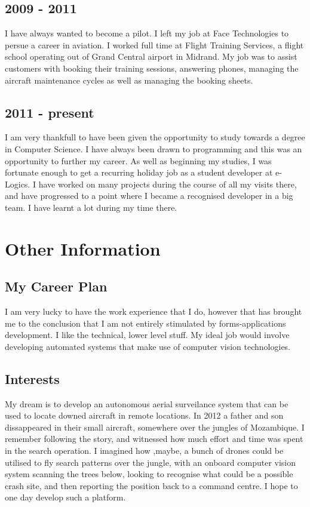 	\subsection*{2009 - 2011}
		I have always wanted to become a pilot. I left my job at Face Technologies to persue a career in aviation. I worked full time at
		Flight Training Services, a flight school operating out of Grand Central airport in Midrand. My job was to assist customers with
		booking their training sessions, answering phones, managing the aircraft maintenance cycles as well as managing the booking sheets.
	\subsection*{2011 - present}
		I am very thankfull to have been given the opportunity to study towards a degree in Computer Science. I have always been drawn to programming
		and this was an opportunity to further my career. As well as beginning my studies, I was fortunate enough to get a recurring holiday job as
		a student developer at e-Logics. I have worked on many projects during the course of all my visits there, and have progressed to a point where I
		became a recognised developer in a big team. I have learnt a lot during my time there.
\newpage
\section*{Other Information}

	\subsection*{My Career Plan}
	
	I am very lucky to have the work experience that I do, however that has brought me to the conclusion that I am not entirely stimulated by forms-applications development.
	I like the technical, lower level stuff. My ideal job would involve developing automated systems that make use of computer vision technologies. 

	\subsection*{Interests}
	
	My dream is to develop an autonomous aerial surveilance system that can be used to locate downed aircraft in remote locations. In 2012 a father and son dissappeared 
	in their small aircraft, somewhere over the jungles of Mozambique. I remember following the story, and witnessed how much effort and time was spent in the search operation.
	I imagined how ,maybe, a bunch of drones could be utilised to fly search patterns over the jungle, with an onboard computer vision system scanning the trees below, looking to
	recognise what could be a possible crash site, and then reporting the position back to a command centre. I hope to one day develop such a platform.

%